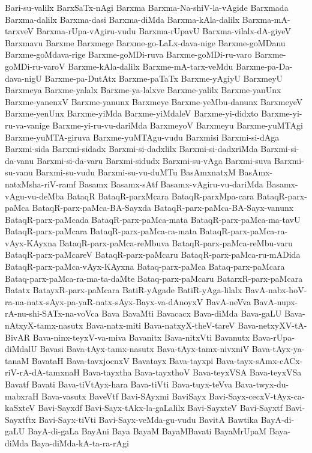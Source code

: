 {Bari-su-valilx
BarxSaTx-nAgi
Barxma
Barxma-Na-shiV-la-vAgide
Barxmada
Barxma-dalilx
Barxma-dasi
Barxma-diMda
Barxma-kAla-dalilx
Barxma-mA-tarxveV
Barxma-rUpa-vAgiru-vudu
Barxma-rUpavU
Barxma-vilalx-dA-giyeV
Barxmavu
Barxme
Barxmege
Barxme-go-LaLx-dava-nige
Barxme-goMDanu
Barxme-goMdava-rige
Barxme-goMDi-ruva
Barxme-goMDi-ru-varo
Barxme-goMDi-ru-varoV
Barxme-kAla-dalilx
Barxme-mA-tarx-veMdu
Barxme-pa-Da-dava-nigU
Barxme-pa-DutAtx
Barxme-paTaTx
Barxme-yAgiyU
BarxmeyU
Barxmeya
Barxme-yalalx
Barxme-ya-lalxve
Barxme-yalilx
Barxme-yanUnx
Barxme-yanenxV
Barxme-yanunx
Barxmeye
Barxme-yeMbu-danunx
BarxmeyeV
Barxme-yenUnx
Barxme-yiMda
Barxme-yiMdaleV
Barxme-yi-didxto
Barxme-yi-ru-va-vanige
Barxme-yi-ru-vu-dariMda
BarxmeyoV
Barxmeyu
Barxme-yuMTAgi
Barxme-yuMTA-giruva
Barxme-yuMTAgu-vudu
Barxmisi
Barxmi-si-dAga
Barxmi-sida
Barxmi-sidadx
Barxmi-si-dadxlilx
Barxmi-si-dadxriMda
Barxmi-si-da-vanu
Barxmi-si-da-varu
Barxmi-sidudx
Barxmi-su-vAga
Barxmi-suva
Barxmi-su-vanu
Barxmi-su-vudu
Barxmi-su-vu-duMTu
BasAmxnatxM
BasAmx-natxMsha-riV-ramf
Basamx
Basamx-sAtf
Basamx-vAgiru-vu-dariMda
Basamx-vAgu-vu-deMba
BataqR
BataqR-parxMcara
BataqR-parxMpa-cara
BataqR-parx-paMca
BataqR-parx-paMca-BA-Sayxda
BataqR-parx-paMca-BA-Sayx-vanunx
BataqR-parx-paMcada
BataqR-parx-paMca-mata
BataqR-parx-paMca-ma-tavU
BataqR-parx-paMcara
BataqR-parx-paMca-ra-mata
BataqR-parx-paMca-ra-vAyx-KAyxna
BataqR-parx-paMca-reMbuva
BataqR-parx-paMca-reMbu-varu
BataqR-parx-paMcareV
BataqR-parx-paMcaru
BataqR-parx-paMca-ru-mADida
BataqR-parx-paMca-vAyx-KAyxna
Bataq-parx-paMca
Bataq-parx-paMcara
Bataq-parx-paMca-ra-ma-ta-daMte
Bataq-parx-paMcaru
BatarxR-parx-paMcara
Batatx
BatayxR-parx-paMcara
BatiR-yAgade
BatiR-yAga-lilalx
BavA-nabx-hoV-ra-na-natx-sAyx-pa-yaR-natx-sAyx-Bayx-va-dAnoyxV
BavA-neVva
BavA-nupx-rA-nu-shi-SATx-na-voVca
Bava
BavaMti
Bavacacx
Bava-diMda
Bava-gaLU
Bava-nAtxyX-tamx-nasutx
Bava-natx-miti
Bava-natxyX-theV-tareV
Bava-netxyXV-tA-BivAR
Bava-ninx-teyxV-va-miva
Bavanitx
Bava-nitxVti
Bavanutx
Bava-rUpa-diMdalU
Bavasi
Bava-tAyx-tamx-nasutx
Bava-tAyx-tamx-nivxniV
Bava-tAyx-ya-tanaM
BavataH
Bava-tavxjocnxV
Bavatayx
Bava-tayxpi
Bava-tayx-sAmx-cACx-riV-rA-dA-tamxnaH
Bava-tayxtha
Bava-tayxthoV
Bava-teyxVSA
Bava-teyxVSa
Bavatf
Bavati
Bava-tiVtAyx-hara
Bava-tiVti
Bava-tuyx-teVva
Bava-twyx-du-mabxraH
Bava-vasutx
BaveVtf
Bavi-SAyxmi
BaviSayx
Bavi-Sayx-cecxV-tAyx-ca-kaSxteV
Bavi-Sayxdf
Bavi-Sayx-tAkx-la-gaLalilx
Bavi-SayxteV
Bavi-Sayxtf
Bavi-Sayxtftx
Bavi-Sayx-tiVti
Bavi-Sayx-veMda-gu-vudu
BavitA
Bawtika
BayA-di-gaLU
BayA-di-gaLa
BayAni
Baya
BayaM
BayaMBavati
BayaMrUpaM
Baya-diMda
Baya-diMda-kA-ta-ra-rAgi
}
